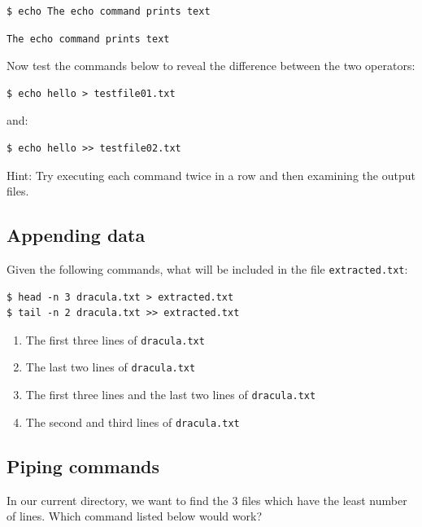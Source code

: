 \documentclass[
]{krantz}
\providecommand{\tightlist}{%
  \setlength{\itemsep}{0pt}\setlength{\parskip}{0pt}}
\begin{document}
\begin{verbatim}
$ echo The echo command prints text
\end{verbatim}

\begin{verbatim}
The echo command prints text
\end{verbatim}

Now test the commands below to reveal the difference between the two operators:

\begin{verbatim}
$ echo hello > testfile01.txt
\end{verbatim}

and:

\begin{verbatim}
$ echo hello >> testfile02.txt
\end{verbatim}

Hint: Try executing each command twice in a row and then examining the output files.

\hypertarget{bash-basics-ex-append-data}{%
\subsection{Appending data}\label{bash-basics-ex-append-data}}

Given the following commands,
what will be included in the file \texttt{extracted.txt}:

\begin{verbatim}
$ head -n 3 dracula.txt > extracted.txt
$ tail -n 2 dracula.txt >> extracted.txt
\end{verbatim}

\begin{enumerate}
\def\labelenumi{\arabic{enumi}.}
\tightlist
\item
  The first three lines of \texttt{dracula.txt}
\item
  The last two lines of \texttt{dracula.txt}
\item
  The first three lines and the last two lines of \texttt{dracula.txt}
\item
  The second and third lines of \texttt{dracula.txt}
\end{enumerate}

\hypertarget{bash-basics-ex-piping}{%
\subsection{Piping commands}\label{bash-basics-ex-piping}}

In our current directory, we want to find the 3 files which have the least number of
lines. Which command listed below would work?
\end{document}
